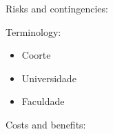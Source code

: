 \documentclass{article}
\begin{document}
Risks and contingencies:

Terminology:

\begin{itemize}
\item Coorte
\item Universidade
\item Faculdade
\end{itemize}

Costs and benefits:



\end{document}
